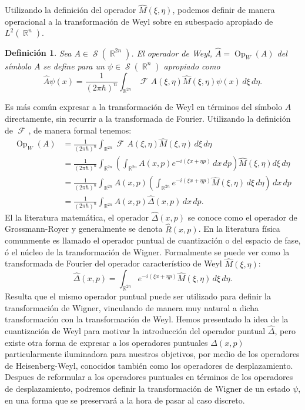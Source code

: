 \documentclass[a4paper]{report}
\DeclareMathOperator{\R}{\mathbb{R}}
\DeclareMathOperator{\Sz}{\mathcal S}
\DeclareMathOperator{\Op}{Op}
\DeclareMathOperator{\Fr}{\mathcal{F}\!}
\newtheorem{definition}{Definición}
\begin{document}
  Utilizando la definición del operador $\hat{M}(\xi,\eta)$,
  podemos definir de manera operacional a la transformación
  de Weyl sobre en subespacio apropiado de $L^2(\R^{n})$.
  \begin{definition}
    Sea $A \in \Sz(\R^{2n})$. El operador de Weyl, $\hat{A}
    = \Op_W(A)$ del símbolo $A$ se define para un $\psi \in
    \Sz(\R^{n})$ apropiado como
    \begin{equation}
      \label{eqn:weyl_quant_2}
      \hat{A}\psi(x)
      = \frac{1}{(2\pi\hbar)^{n}}
      \int_{\R^{2n}} \Fr A(\xi,\eta) \hat{M}(\xi,\eta)
      \psi(x) \, d\xi \, d\eta.
    \end{equation}
  \end{definition}
  Es más común expresar a la transformación de Weyl en
  términos del símbolo $A$ directamente, sin recurrir a la
  transformada de Fourier. Utilizando la definición de
  $\Fr$, de manera formal tenemos:
  \begin{align*}
    \Op_W(A)
    &= \frac{1}{(2\pi\hbar)^{n}} \int_{\R^{2n}} \Fr
    A(\xi,\eta)\hat{M}(\xi,\eta) \, d\xi \, d\eta \\
    &= \frac{1}{(2\pi\hbar)^{n}} \int_{\R^{2n}} \left(
    \int_{\R^{2n}} A(x,p)e^{-i(\xi x + \eta p)} \, dx \, dp
    \right) \hat{M}(\xi,\eta) d\xi \, d\eta \\
    &= \frac{1}{(2\pi\hbar)^{n}} \int_{\R^{2n}} A(x,p)
    \left( \int_{\R^{2n}} e^{-i(\xi x + \eta p)}
    \hat{M}(\xi,\eta) \, d\xi \, d\eta \right) \, dx \, dp
    \\
    &= \frac{1}{(2\pi\hbar)^{n}} \int_{\R^{2n}} A(x,p)
    \hat \Delta(x,p) \, dx \, dp.
  \end{align*} 
  El la literatura matemática, el operador $\hat
  \Delta(x,p)$ se conoce como el operador de Grossmann-Royer
  y generalmente se denota $\hat{R}(x,p)$. En la literatura
  física comunmente es llamado el operador puntual de
  cuantización o del espacio de fase, ó el núcleo de la
  transformación de Wigner. Formalmente se puede ver como la
  transformada de Fourier del operador característico de
  Weyl $\hat{M}(\xi,\eta)$:
  \begin{equation}
    \label{eqn:phase_point_operator}
    \hat \Delta(x,p)
    = \int_{\R^{2n}} e^{-i(\xi x + \eta p)}
    \hat{M}(\xi,\eta) \, d\xi \, d\eta.
  \end{equation}
  Resulta que el mismo operador puntual puede ser utilizado
  para definir la transformación de Wigner, vinculando de
  manera muy natural a dicha transformación con la
  transformación de Weyl. Hemos presentado la idea de la
  cuantización de Weyl para motivar la introducción del
  operador puntual $\hat \Delta$, pero existe otra forma de
  expresar a los operadores puntuales $\Delta(x,p)$
  particularmente iluminadora para nuestros objetivos, por
  medio de los operadores de Heisenberg-Weyl, conocidos
  también como los operadores de desplazamiento. Despues de
  reformular a los operadores puntuales en términos de los
  operadores de desplazamiento, podremos definir la
  transformación de Wigner de un estado $\psi$, en una forma
  que se preservará a la hora de pasar al caso discreto.
\end{document}
